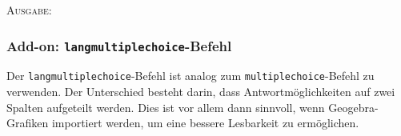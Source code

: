 \documentclass[a4paper,12pt]{article}
\begin{document}
\textsc{Ausgabe:}


\leer
\newpage

\subsubsection{Add-on: \texttt{langmultiplechoice}-Befehl}

Der \texttt{langmultiplechoice}-Befehl ist analog zum \texttt{multiplechoice}-Befehl zu verwenden. Der Unterschied besteht darin, dass Antwortmöglichkeiten auf zwei Spalten aufgeteilt werden. Dies ist vor allem dann sinnvoll, wenn Geogebra-Grafiken importiert werden, um eine bessere Lesbarkeit zu ermöglichen.
\end{document}
